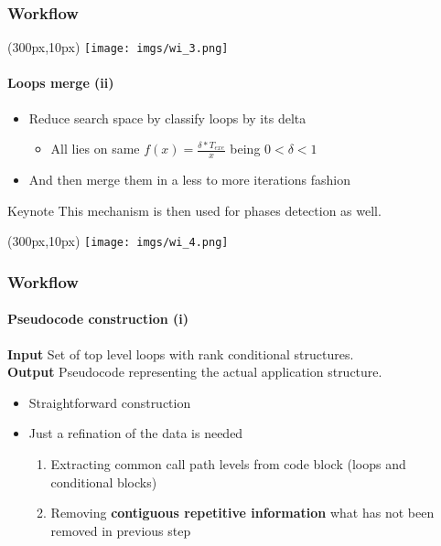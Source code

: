 \documentclass{beamer}
\begin{document}
\begin{frame}
\frametitle{Workflow}
\begin{textblock*}{5cm}(300px,10px) %
	\texttt{[image: imgs/wi\_3.png]}
\end{textblock*}
\framesubtitle{Loops merge (ii)}
\begin{itemize}
	\pause
	\item Reduce search space by classify loops by its delta
	\begin{itemize}
		\item All lies on same $f(x)=\frac{\delta*T_{exe}}{x}$ being $0 < \delta < 1$
	\end{itemize}
	\item And then merge them in a less to more iterations fashion
\end{itemize}
\pause
\begin{block}{Keynote}
	This mechanism is then used for phases detection as well.
\end{block}
\end{frame}

\begin{frame}
\begin{textblock*}{5cm}(300px,10px) %
	\texttt{[image: imgs/wi\_4.png]}
\end{textblock*}
\frametitle{Workflow}
\framesubtitle{Pseudocode construction (i)}
\begin{mdframed}[backgroundcolor=blue!10,roundcorner=10pt,linewidth=0pt]
\textbf{Input} Set of top level loops with rank conditional structures.\\
\textbf{Output} Pseudocode representing the actual application structure.
\end{mdframed}
\vfill
\pause
\begin{itemize}
	\item Straightforward construction
	\item Just a refination of the data is needed
	\begin{enumerate}
		\item Extracting common call path levels from code block (loops and conditional blocks)
		\item Removing \textbf{contiguous repetitive information} what has not been removed in previous step
	\end{enumerate}
\end{itemize}
\end{frame}
\end{document}
